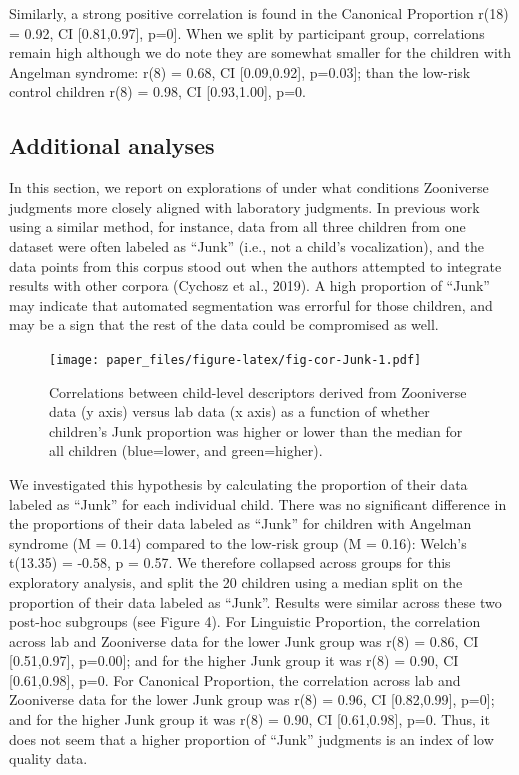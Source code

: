 \documentclass[english,,man]{apa6}
\begin{document}
Similarly, a strong positive correlation is found in the Canonical Proportion r(18) = 0.92, CI {[}0.81,0.97{]}, p=0{]}. When we split by participant group, correlations remain high although we do note they are somewhat smaller for the children with Angelman syndrome: r(8) = 0.68, CI {[}0.09,0.92{]}, p=0.03{]}; than the low-risk control children r(8) = 0.98, CI {[}0.93,1.00{]}, p=0.

\hypertarget{additional-analyses}{%
\subsection{Additional analyses}\label{additional-analyses}}

In this section, we report on explorations of under what conditions Zooniverse judgments more closely aligned with laboratory judgments. In previous work using a similar method, for instance, data from all three children from one dataset were often labeled as \enquote{Junk} (i.e., not a child's vocalization), and the data points from this corpus stood out when the authors attempted to integrate results with other corpora (Cychosz et al., 2019). A high proportion of \enquote{Junk} may indicate that automated segmentation was errorful for those children, and may be a sign that the rest of the data could be compromised as well.

\begin{figure}
\centering
\texttt{[image: paper\_files/figure-latex/fig-cor-Junk-1.pdf]}
\caption{\label{fig:fig-cor-Junk}Correlations between child-level descriptors derived from Zooniverse data (y axis) versus lab data (x axis) as a function of whether children's Junk proportion was higher or lower than the median for all children (blue=lower, and green=higher).}
\end{figure}

We investigated this hypothesis by calculating the proportion of their data labeled as \enquote{Junk} for each individual child. There was no significant difference in the proportions of their data labeled as \enquote{Junk} for children with Angelman syndrome (M = 0.14) compared to the low-risk group (M = 0.16): Welch's t(13.35) = -0.58, p = 0.57. We therefore collapsed across groups for this exploratory analysis, and split the 20 children using a median split on the proportion of their data labeled as \enquote{Junk}. Results were similar across these two post-hoc subgroups (see Figure 4). For Linguistic Proportion, the correlation across lab and Zooniverse data for the lower Junk group was r(8) = 0.86, CI {[}0.51,0.97{]}, p=0.00{]}; and for the higher Junk group it was r(8) = 0.90, CI {[}0.61,0.98{]}, p=0. For Canonical Proportion, the correlation across lab and Zooniverse data for the lower Junk group was r(8) = 0.96, CI {[}0.82,0.99{]}, p=0{]}; and for the higher Junk group it was r(8) = 0.90, CI {[}0.61,0.98{]}, p=0. Thus, it does not seem that a higher proportion of \enquote{Junk} judgments is an index of low quality data.
\end{document}
